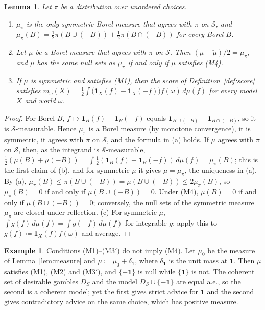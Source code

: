 \documentclass[11pt]{article}
\newcommand{\one}{\mathbf{1}}
\theoremstyle{plain}
\newtheorem{lemma}[theorem]{Lemma}
\theoremstyle{definition}
\newtheorem{example}[theorem]{Example}
\begin{document}
\begin{lemma}\label{lem:unordered}
Let $\pi$ be a distribution over unordered choices.
\begin{enumerate}[label=(\alph*)]
  \item $\mu_\pi$ is the only symmetric Borel measure that agrees with $\pi$ on $\mathcal S$, and
  $\mu_\pi(B)=\tfrac12\pi(B\cup(-B))+\tfrac12\pi(B\cap(-B))$ for every Borel $B$.
  \item Let $\mu$ be a Borel measure that agrees with $\pi$ on $\mathcal S$. Then
  $(\mu+\check\mu)/2=\mu_\pi$, and $\mu$ has the same null sets as $\mu_\pi$ if and only if $\mu$
  satisfies (M4).
  \item If $\mu$ is symmetric and satisfies (M1), then the score of Definition~\ref{def:score}
  satisfies $m_\omega(X)=\tfrac12\int\bigl(\one_X(f)-\one_X(-f)\bigr)f(\omega)\,d\mu(f)$ for
  every model $X$ and world $\omega$.
\end{enumerate}
\end{lemma}

\begin{proof}
For Borel $B$, $f\mapsto\one_B(f)+\one_B(-f)$ equals $\one_{B\cup(-B)}+\one_{B\cap(-B)}$, so it
is $\mathcal S$-measurable. Hence $\mu_\pi$ is a Borel measure (by monotone convergence), it is
symmetric, it agrees with $\pi$ on $\mathcal S$, and the formula in (a) holds. If $\mu$ agrees
with $\pi$ on $\mathcal S$, then, as the integrand is $\mathcal S$-measurable,
$\tfrac12(\mu(B)+\mu(-B))=\int\tfrac12(\one_B(f)+\one_B(-f))\,d\mu(f)=\mu_\pi(B)$; this is the
first claim of (b), and for symmetric $\mu$ it gives $\mu=\mu_\pi$, the uniqueness in (a). By
(a), $\mu_\pi(B)\le\pi(B\cup(-B))=\mu(B\cup(-B))\le2\mu_\pi(B)$, so $\mu_\pi(B)=0$ if and only
if $\mu(B\cup(-B))=0$. Under (M4), $\mu(B)=0$ if and only if $\mu(B\cup(-B))=0$; conversely,
the null sets of the symmetric measure $\mu_\pi$ are closed under reflection. (c) For symmetric
$\mu$, $\int g(f)\,d\mu(f)=\int g(-f)\,d\mu(f)$ for integrable $g$; apply this to
$g(f)\coloneqq\one_X(f)f(\omega)$ and average.
\end{proof}

\begin{example}\label{ex:noreflection}
Conditions (M1)--(M3$'$) do not imply (M4). Let $\mu_0$ be the measure of
Lemma~\ref{lem:measure} and $\mu\coloneqq\mu_0+\delta_{\one}$, where $\delta_{\one}$ is the unit
mass at $\one$. Then $\mu$ satisfies (M1), (M2) and (M3$'$), and $\{-\one\}$ is null while
$\{\one\}$ is not. The coherent set of desirable gambles $D_S$ and the model $D_S\cup\{-\one\}$
are equal a.e., so the second is a coherent model; yet the first gives strict advice for $\one$
and the second gives contradictory advice on the same choice, which has positive measure.
\end{example}
\end{document}
